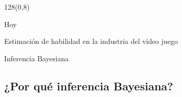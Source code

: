 \documentclass[shownotes]{beamer}
\begin{document}
\begin{frame}
\begin{textblock}{128}(0,8)
\begin{center}
 \Large Hoy 
 
 \large Estimaci\'on de habilidad en la industria del video juego
\end{center}
\end{textblock}

\vspace{0.75cm}


\pause
\normalsize
\vspace{1.2cm}

\centering \large Inferencia Bayesiana



% 
%  
% 
% 

\end{frame}


\subsection{¿Por qu\'e inferencia Bayesiana?}
\end{document}
